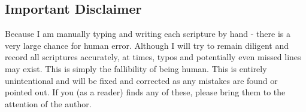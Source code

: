 \subsection*{Important Disclaimer}

Because I am manually typing and writing each scripture by hand - there is a very large chance for human error. Although I will try to remain diligent and record all scriptures accurately, at times, typos and potentially even missed lines may exist. This is simply the fallibility of being human. This is entirely unintentional and will be fixed and corrected as any mistakes are found or pointed out. If you (as a reader) finds any of these, please bring them to the attention of the author.
